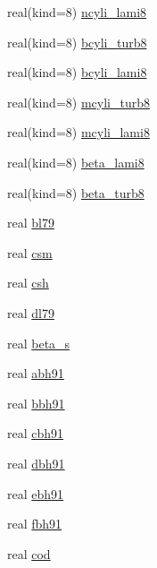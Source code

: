 \begin{DoxyCompactItemize}
\item 
real(kind=8) \hyperlink{namespacecanopy__air__coms_a6f097ca1a4dda12b169f6686939871c0}{ncyli\+\_\+lami8}
\item 
real(kind=8) \hyperlink{namespacecanopy__air__coms_a2f1fda0ccc380bdd8526ea6e1fecb924}{bcyli\+\_\+turb8}
\item 
real(kind=8) \hyperlink{namespacecanopy__air__coms_ad7c65a1b664eb04c6665e7d5a9fc5380}{bcyli\+\_\+lami8}
\item 
real(kind=8) \hyperlink{namespacecanopy__air__coms_ad1cdd46134a9b31835e735884f28e3d0}{mcyli\+\_\+turb8}
\item 
real(kind=8) \hyperlink{namespacecanopy__air__coms_a2c460170035d9a0e3fd4458a165411f2}{mcyli\+\_\+lami8}
\item 
real(kind=8) \hyperlink{namespacecanopy__air__coms_a9493ec4099bf6cd11334e808cd169e72}{beta\+\_\+lami8}
\item 
real(kind=8) \hyperlink{namespacecanopy__air__coms_a42dff1bd5a176d0269c6456ecbd1be1d}{beta\+\_\+turb8}
\item 
real \hyperlink{namespacecanopy__air__coms_ac5812d4be4754c78cd9f1aad023660ba}{bl79}
\item 
real \hyperlink{namespacecanopy__air__coms_a7f257392c2baec6b0f4fe27bd17f809d}{csm}
\item 
real \hyperlink{namespacecanopy__air__coms_aea71c9950d7caa44dcaae548a1d02058}{csh}
\item 
real \hyperlink{namespacecanopy__air__coms_a74b9e27e0f352ab01d8e4aaa567ad2ce}{dl79}
\item 
real \hyperlink{namespacecanopy__air__coms_a1b58671dba4d2fefd5790694e6563f7c}{beta\+\_\+s}
\item 
real \hyperlink{namespacecanopy__air__coms_a8943107817bd72a2ecf2c8ac35516efc}{abh91}
\item 
real \hyperlink{namespacecanopy__air__coms_a19448a094bac99003898bfd3170277e3}{bbh91}
\item 
real \hyperlink{namespacecanopy__air__coms_ae0cae45535d33e82cf2fe8547c1d8dc2}{cbh91}
\item 
real \hyperlink{namespacecanopy__air__coms_a1b28513486b59cf5dc849476f8a8fb8b}{dbh91}
\item 
real \hyperlink{namespacecanopy__air__coms_a3499170cfdc0dbef4966b323d442e71a}{ebh91}
\item 
real \hyperlink{namespacecanopy__air__coms_ac7b57b769f421b5bb07a3ec88e5c6883}{fbh91}
\item 
real \hyperlink{namespacecanopy__air__coms_adc430e44db14a933a4e8359ca834f454}{cod}

\end{DoxyCompactItemize}

